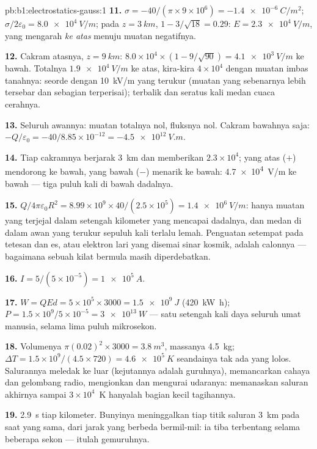 \begin{solution}{pb:b1:electrostatics-gauss:1}
\textbf{11.} $\sigma = -40/(\pi \times 9 \times 10^6) = \qty{-1.4e-6}{C/m^2}$; $\sigma/2\varepsilon_0 =
\qty{8.0e4}{V/m}$; pada $z = \qty{3}{km}$, $1 - 3/\sqrt{18} = 0.29$: $E =
\qty{2.3e4}{V/m}$, yang mengarah \emph{ke atas} menuju muatan negatifnya.

\textbf{12.} Cakram atasnya, $z = \qty{9}{km}$: $8.0 \times 10^4 \times (1 - 9/\sqrt{90}) =
\qty{4.1e3}{V/m}$ ke bawah. Totalnya $\qty{1.9e4}{V/m}$ ke atas, kira-kira $4 \times 10^4$
dengan muatan imbas tanahnya: seorde dengan \qty{10}{kV/m}
yang terukur (muatan yang sebenarnya lebih tersebar dan sebagian terperisai);
terbalik dan seratus kali medan cuaca cerahnya.

\textbf{13.} Seluruh awannya: muatan totalnya nol, fluksnya nol. Cakram bawahnya saja:
$-Q/\varepsilon_0 = -40/8.85 \times 10^{-12} = \qty{-4.5e12}{V.m}$.

\textbf{14.} Tiap cakramnya berjarak \qty{3}{km} dan memberikan $2.3 \times 10^4$; yang
atas ($+$) mendorong ke bawah, yang bawah ($-$) menarik ke bawah: \qty{4.7e4}{V/m}
ke bawah --- tiga puluh kali di bawah dadalnya.

\textbf{15.} $Q/4\pi\varepsilon_0R^2 = 8.99 \times 10^9 \times 40/(2.5 \times 10^5) =
\qty{1.4e6}{V/m}$: hanya muatan yang terjejal dalam setengah kilometer yang mencapai
dadalnya, dan medan di dalam awan yang terukur sepuluh kali terlalu lemah. Penguatan
setempat pada tetesan dan es, atau elektron lari yang disemai sinar
kosmik, adalah calonnya --- bagaimana sebuah kilat bermula masih diperdebatkan.

\textbf{16.} $I = 5/(5 \times 10^{-5}) = \qty{1e5}{A}$.

\textbf{17.} $W = QEd = 5 \times 10^5 \times 3000 = \qty{1.5e9}{J}$ (\qty{420}{kW h});
$P = 1.5 \times 10^9/5 \times 10^{-5} = \qty{3e13}{W}$ --- satu setengah kali
daya seluruh umat manusia, selama lima puluh mikrosekon.

\textbf{18.} Volumenya $\pi(0.02)^2 \times 3000 = \qty{3.8}{m^3}$, massanya \qty{4.5}{kg};
$\Delta T = 1.5 \times 10^9/(4.5 \times 720) = \qty{4.6e5}{K}$ seandainya tak ada yang lolos.
Salurannya meledak ke luar (kejutannya adalah guruhnya), memancarkan cahaya
dan gelombang radio, mengionkan dan mengurai udaranya: memanaskan saluran
akhirnya sampai $3 \times 10^4$~K hanyalah bagian kecil tagihannya.

\textbf{19.} \qty{2.9}{s} tiap kilometer. Bunyinya meninggalkan tiap titik
saluran \qty{3}{km} pada saat yang sama, dari jarak yang berbeda bermil-mil: ia
tiba terbentang selama beberapa sekon --- itulah gemuruhnya.


\end{solution}
